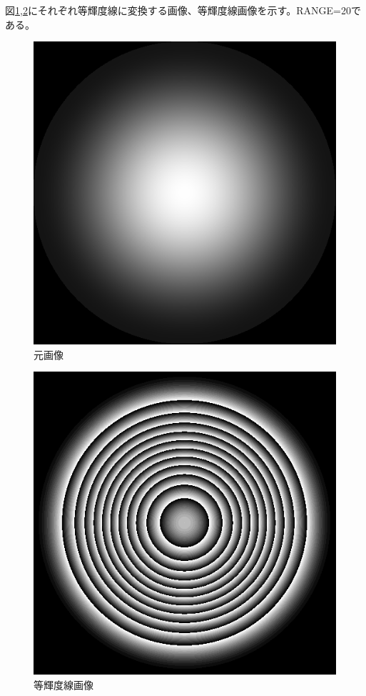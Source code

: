 \documentclass[11pt,a4paper,titlepage,dvipdfmx]{jarticle}
\begin{document}
    図\ref{fig:ham512},\ref{fig:after-ham512}にそれぞれ等輝度線に変換する画像、等輝度線画像を示す。RANGE=20である。

    \begin{figure}[H]
      \centering
      \includegraphics[scale=.8]{./ham512.bmp}
      \caption{元画像}
      \label{fig:ham512}
    \end{figure} 
    \begin{figure}[H]
      \centering
      \includegraphics[scale=.8]{./after-ham512.bmp}
      \caption{等輝度線画像}
      \label{fig:after-ham512}
    \end{figure} 
\end{document}
